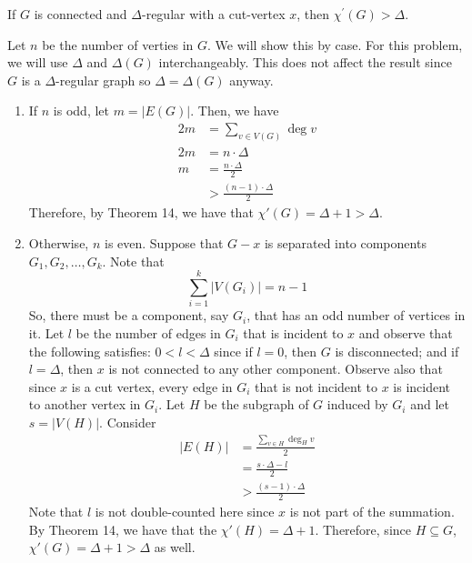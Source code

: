 \setcounter{question}{5}
\question If \(G\) is connected and \(\Delta\)-regular with a
  cut-vertex \(x\), then \(\chi^{\prime}(G)>\Delta\).
\begin{solution}
  Let \(n\) be the number of verties in \(G\). We will show this
  by case. For this problem, we will use \(\Delta\) and
  \(\Delta(G)\) interchangeably. This does not affect the result
  since \(G\) is a \(\Delta\)-regular graph so \(\Delta =
  \Delta(G)\) anyway.

  \begin{enumerate}[label=\Roman*.]
    \item If \(n\) is odd, let \(m = |E(G)|\). Then, we have 
      \[
        \begin{aligned}
          2m &= \sum_{v \in V(G)} \deg v \\
          2m &= n \cdot \Delta \\
          m  &= \frac{n \cdot \Delta}{2} \\
             &> \frac{(n-1) \cdot \Delta}{2} 
        \end{aligned}
      \]
      Therefore, by Theorem 14, we have that \(\chi'(G) =
      \Delta + 1 > \Delta\).

    \item Otherwise, \(n\) is even. Suppose that \(G - x\) is
      separated into components \(G_1, G_2, \ldots, G_k\).
      Note that
      \[ \sum_{i=1}^k |V(G_i)| = n-1 \]
      So, there must be a component, say \(G_i\), that has an odd
      number of vertices in it. Let \(l\) be the number of edges
      in \(G_i\)
      that is incident to \(x\) and observe that the following 
      satisfies: \(0 < l < \Delta\) since if \(l = 0\), then \(G\)
      is disconnected; and if \(l = \Delta\), then \(x\) is not
      connected to any other component.
      Observe also that since \(x\) is a cut vertex, every edge in
      \(G_i\) that is not incident to \(x\) is incident to
      another vertex in \(G_i\).
      Let \(H\) be the subgraph of \(G\) induced
      by \(G_i\) and let \(s = |V(H)|\). Consider
      \[
        \begin{aligned}
          |E(H)| &= \frac{\sum_{v \in H} \deg_H v}{2} \\
                 &= \frac{s \cdot \Delta - l}{2} \\
                 &> \frac{(s-1)\cdot\Delta}{2}
        \end{aligned}
      \]
      Note that \(l\) is not double-counted here since \(x\) is
      not part of the summation.
      By Theorem 14, we have that the \(\chi'(H) = \Delta+1\).
      Therefore, since \(H \subseteq G\), \(\chi'(G) = \Delta+1 >
      \Delta\) as well.
  \end{enumerate}
\end{solution}
